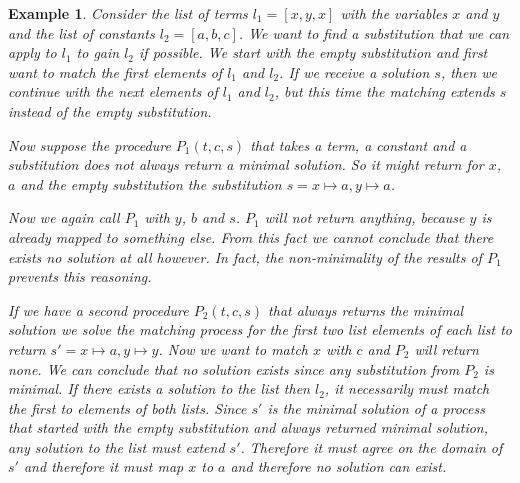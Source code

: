 \documentclass{article}
\newtheorem{example}{Example}
\begin{document}
        \begin{example}
            Consider the list of terms $l_1 = [x, y, x]$ with the variables $x$ and $y$ and the list of constants $l_2 = [a,b, c]$. We want to find a substitution that we can apply to $l_1$ to gain $l_2$ if possible. We start with the empty substitution and first want to match the first elements of $l_1$ and $l_2$. If we receive a solution $s$, then we continue with the next elements of $l_1$ and $l_2$, but this time the matching extends $s$ instead of the empty substitution.

            Now suppose the procedure $P_1(t,c, s)$ that takes a term, a constant and a substitution does not always return a minimal solution. So it might return for $x$, $a$ and the empty substitution the substitution $s = x \mapsto a, y\mapsto a$.

            Now we again call $P_1$ with $y$, $b$ and $s$. $P_1$ will not return anything, because $y$ is already mapped to something else. From this fact we cannot conclude that there exists no solution at all however. In fact, the non-minimality of the results of $P_1$ prevents this reasoning.

            If we have a second procedure $P_2(t,c, s)$ that always returns the minimal solution we solve the matching process for the first two list elements of each list to return $s' = x \mapsto a, y \mapsto y$. Now we want to match $x$ with $c$ and $P_2$ will return none. We can conclude that no solution exists since any substitution from $P_2$ is minimal. If there exists a solution to the list then $l_2$, it necessarily must match the first to elements of both lists. Since $s'$ is the minimal solution of a process that started with the empty substitution and always returned minimal solution, any solution to the list must extend $s'$. Therefore it must agree on the domain of $s'$ and therefore it must map $x$ to $a$ and therefore no solution can exist.

        \end{example}
\end{document}
